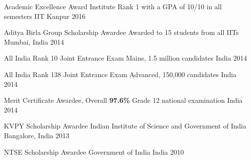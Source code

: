 
\vspace{-0.3cm}



\begin{cvhonors}


  \cvhonor
  {Academic Excellence Award} %
  {Institute Rank 1 with a GPA of 10/10 in all semesters} %
  {IIT Kanpur} %
  {2016} %

  \cvhonor
  {Aditya Birla Group Scholarship Awardee}
  {Awarded to 15 students from all IITs}
  {Mumbai, India}
  {2014}

  \cvhonor
  {All India Rank 10} %
  {Joint Entrance Exam Mains, 1.5 million candidates} %
  {India} %
  {2014} %


  \cvhonor
  {All India Rank 138} %
  {Joint Entrance Exam Advanced, 150,000 candidates} %
  {India} %
  {2014} %

  \cvhonor
  {Merit Certificate Awardee, Overall \textbf{97.6\%}}
  {Grade 12 national examination}
  {India}
  {2014}

  \cvhonor
  {KVPY Scholarship Awardee}
  {Indian Institute of Science and Government of India}
  {Bangalore, India}
  {2013}

  \cvhonor
  {NTSE Scholarship Awardee}
  {Government of India}
  {India}
  {2010}


\end{cvhonors}

